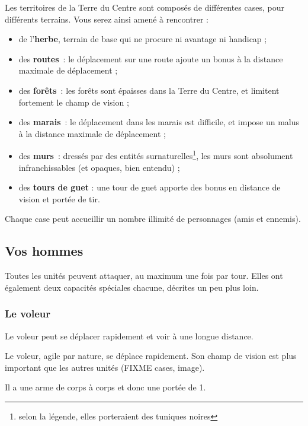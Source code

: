Les territoires de la Terre du Centre sont composés de différentes
cases, pour différents terrains. Vous serez ainsi amené à rencontrer :

\begin{itemize}
  \item de l'\textbf{herbe}, terrain de base qui ne procure ni
    avantage ni handicap ;
  \item des \textbf{routes}~: le déplacement sur une route ajoute un
    bonus à la distance maximale de déplacement ;
  \item des \textbf{forêts}~: les forêts sont épaisses dans la Terre du
    Centre, et limitent fortement le champ de vision ;
  \item des \textbf{marais}~: le déplacement dans les marais est
    difficile, et impose un malus à la distance maximale de
    déplacement ;
  \item des \textbf{murs}~: dressés par des entités
    surnaturelles\footnote{selon la légende, elles porteraient des
      tuniques noires}, les murs sont absolument infranchissables (et
    opaques, bien entendu) ;
  \item des \textbf{tours de guet} : une tour de guet apporte des
    bonus en distance de vision et portée de tir.
\end{itemize}

Chaque case peut accueillir un nombre illimité de personnages (amis et ennemis).

\subsection{Vos hommes}
\prolocitation{}

Toutes les unités peuvent attaquer, au maximum une fois par
tour. Elles ont également deux capacités spéciales chacune, décrites
un peu plus loin.

\subsubsection{Le voleur}


Le voleur peut se déplacer rapidement et voir à une longue distance.

Le voleur, agile par nature, se déplace rapidement. Son champ de vision est plus important que les autres unités (FIXME cases, image).

Il a une arme de corps à corps et donc une portée de 1.

